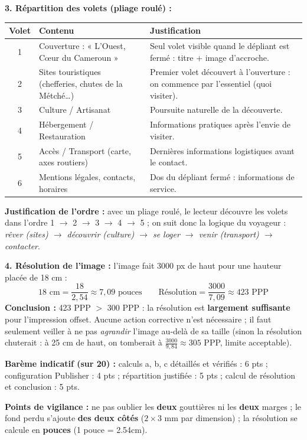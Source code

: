 \documentclass[11pt]{article}
\begin{document}
\begin{corrige}
\textbf{3. Répartition des volets (pliage roulé) :}
\begin{center}
\begin{tabularx}{\linewidth}{|c|l|X|}
\hline
\rowcolor{popblueL} \textbf{Volet} & \textbf{Contenu} & \textbf{Justification} \\ \hline
1 & Couverture : « L'Ouest, Cœur du Cameroun » & Seul volet visible quand le dépliant est fermé : titre + image d'accroche. \\ \hline
2 & Sites touristiques (chefferies, chutes de la Métché\ldots) & Premier volet découvert à l'ouverture : on commence par l'essentiel (quoi visiter). \\ \hline
3 & Culture / Artisanat & Poursuite naturelle de la découverte. \\ \hline
4 & Hébergement / Restauration & Informations pratiques après l'envie de visiter. \\ \hline
5 & Accès / Transport (carte, axes routiers) & Dernières informations logistiques avant le contact. \\ \hline
6 & Mentions légales, contacts, horaires & Dos du dépliant fermé : informations de service. \\ \hline
\end{tabularx}
\end{center}
\textbf{Justification de l'ordre :} avec un pliage roulé, le lecteur découvre les volets dans l'ordre 1 $\rightarrow$ 2 $\rightarrow$ 3 $\rightarrow$ 4 $\rightarrow$ 5 ; on suit donc la logique du voyageur : \emph{rêver (sites) $\rightarrow$ découvrir (culture) $\rightarrow$ se loger $\rightarrow$ venir (transport) $\rightarrow$ contacter}.

\textbf{4. Résolution de l'image :} l'image fait 3000 px de haut pour une hauteur placée de 18 cm :
\[
18 \text{ cm} = \frac{18}{2,54} \approx 7,09 \text{ pouces} \qquad \text{Résolution} = \frac{3000}{7,09} \approx 423 \text{ PPP}
\]
\textbf{Conclusion :} 423 PPP $>$ 300 PPP : la résolution est \textbf{largement suffisante} pour l'impression offset. Aucune action corrective n'est nécessaire ; il faut seulement veiller à ne pas \emph{agrandir} l'image au-delà de sa taille (sinon la résolution chuterait : à 25 cm de haut, on tomberait à $\frac{3000}{9,84} \approx 305$ PPP, limite acceptable).

\textbf{Barème indicatif (sur 20) :} calculs a, b, c détaillés et vérifiés : 6 pts ; configuration Publisher : 4 pts ; répartition justifiée : 5 pts ; calcul de résolution et conclusion : 5 pts.

\textbf{Points de vigilance :} ne pas oublier les \textbf{deux} gouttières ni les \textbf{deux} marges ; le fond perdu s'ajoute \textbf{des deux côtés} ($2 \times 3$ mm par dimension) ; la résolution se calcule en \textbf{pouces} (1 pouce = 2.54cm).
\end{corrige}
\end{document}
